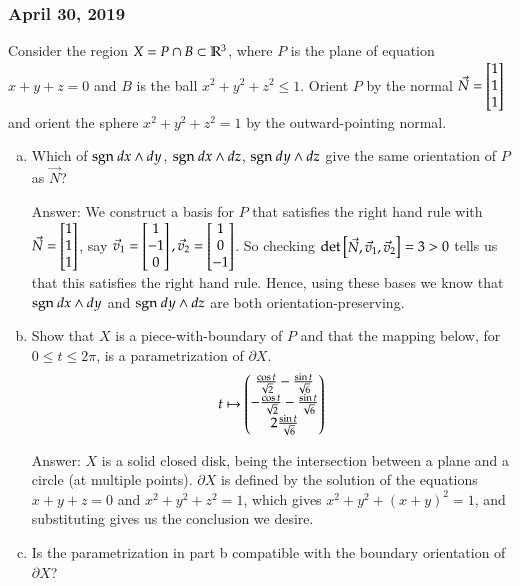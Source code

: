 \subsubsection*{April 30, 2019}

 Consider the region $X=P\cap B \subset \mathbb{R}^3$, where $P$ is the plane of equation $x+y+z=0$ and $B$ is the ball $x^2+y^2+z^2\leq 1$. Orient $P$ by the normal $\vec{N}=\begin{bmatrix} 1 \\ 1 \\ 1 \end{bmatrix}$ and orient the sphere $x^2+y^2+z^2=1$ by the outward-pointing normal. 

\begin{enumerate}[a.]
	\item Which of $\mathrm{sgn}\  dx\land dy$, $\mathrm{sgn}\  dx \land dz$, $\mathrm{sgn}\  dy\land dz$ give the same orientation of $P$ as $\vec{N}$? 
	
	Answer: We construct a basis for $P$ that satisfies the right hand rule with $\vec{N}=\begin{bmatrix} 1 \\ 1 \\ 1 \end{bmatrix}$, say $\vec{v}_1 = \begin{bmatrix} 1 \\ -1 \\ 0 \end{bmatrix}, \vec{v}_2 = \begin{bmatrix} 1 \\ 0 \\ -1 \end{bmatrix}$. So checking $\mathrm{det} \begin{bmatrix} \vec{N},\vec{v}_1,\vec{v}_2 \end{bmatrix}=3>0$ tells us that this satisfies the right hand rule. Hence, using these bases we know that $\mathrm{sgn}\  dx\land dy$ and $\mathrm{sgn}\  dy\land dz$ are both orientation-preserving.
	
	\item Show that $X$ is a piece-with-boundary of $P$ and that the mapping below, for $0\leq t\leq 2\pi$, is a parametrization of $\partial X$. 
	\[t\mapsto \begin{pmatrix}  \frac{\cos t}{\sqrt{2}}-\frac{\sin t}{\sqrt{6}} \\ -\frac{\cos t}{\sqrt{2}}-\frac{\sin t}{\sqrt{6}} \\ 2\frac{\sin t}{\sqrt{6}} \end{pmatrix}\]
	
	Answer: $X$ is a solid closed disk, being the intersection between a plane and a circle (at multiple points). $\partial X$ is defined by the solution of the equations $x+y+z=0$ and $x^2+y^2+z^2=1$, which gives $x^2+y^2+(x+y)^2=1$, and substituting gives us the conclusion we desire. 
	
	\item Is the parametrization in part b compatible with the boundary orientation of $\partial X$? 
	
\end{enumerate}